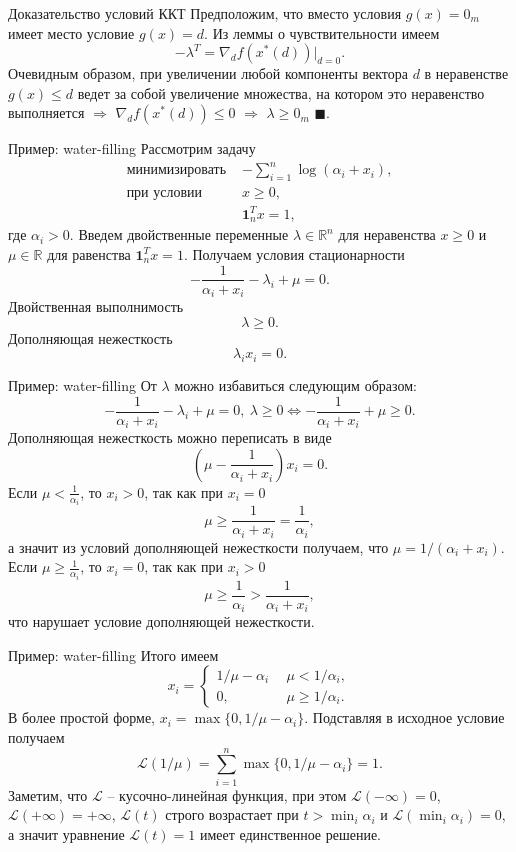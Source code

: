 \documentclass[10pt]{beamer}
\begin{document}
\begin{frame}{Доказательство условий ККТ}
Предположим, что вместо условия $g(x)=0_m$ имеет место условие $g(x)=d$. Из леммы о чувствительности имеем
$$
-\lambda^T=\nabla_d f(x^*(d))|_{d=0}.
$$
Очевидным образом, при увеличении любой компоненты вектора $d$ в неравенстве $g(x)\leq d$ ведет за собой увеличение множества, на котором это неравенство выполняется 
$\Rightarrow$ $\nabla_d f(x^*(d))\leq 0$ $\Rightarrow$ $\lambda\geq 0_m$ $\blacksquare$.

\end{frame}

\begin{frame}{Пример: water-filling}
Рассмотрим задачу
$$
\begin{array}{ll}
\mbox{минимизировать } & -\sum_{i=1}^n\log(\alpha_i+x_i),\\
\mbox{при условии }   & x\geq 0, \\
 & \mathbf{1}_n^Tx=1,
\end{array}
$$
где $\alpha_i>0$. Введем двойственные переменные $\lambda\in \mathbb{R}^n$ для неравенства $x\geq 0$ и $\mu\in \mathbb{R}$ для равенства $\mathbf{1}_n^Tx=1$. Получаем условия стационарности
$$
-\frac{1}{\alpha_i+x_i}-\lambda_i+\mu=0.
$$
Двойственная выполнимость 
$$
\lambda\geq 0.
$$
Дополняющая нежесткость
$$
\lambda_ix_i=0.
$$
\end{frame}
\begin{frame}{Пример: water-filling}
От $\lambda$ можно избавиться следующим образом:
$$
-\frac{1}{\alpha_i+x_i}-\lambda_i+\mu=0,~\lambda\geq 0 \Leftrightarrow
-\frac{1}{\alpha_i+x_i}+\mu\geq 0.
$$
Дополняющая нежесткость можно переписать в виде
$$
\left(\mu-\frac{1}{\alpha_i+x_i}\right)x_i=0.
$$
Если $\mu<\frac{1}{\alpha_i}$, то $x_i>0$, так как при $x_i=0$
$$
\mu\geq \frac{1}{\alpha_i+x_i}=\frac{1}{\alpha_i},
$$
а значит из условий дополняющей нежесткости получаем, что $\mu=1/(\alpha_i+x_i)$. \\
Если $\mu\geq \frac{1}{\alpha_i}$, то $x_i=0$, так как при $x_i>0$
$$
\mu\geq \frac{1}{\alpha_i}>\frac{1}{\alpha_i+x_i},
$$
что нарушает условие дополняющей нежесткости. 

\end{frame}

\begin{frame}{Пример: water-filling}
Итого имеем
$$
x_i=\left\{\begin{array}{ll}
1/\mu-\alpha_i ~&~\mu<1/\alpha_i,\\
0, ~&~\mu\geq 1/\alpha_i.
\end{array}\right.
$$
В более простой форме, $x_i=\max\{0, 1/\mu-\alpha_i\}$. Подставляя в исходное условие получаем
$$
\mathcal{L}(1/\mu)=\sum_{i=1}^n\max\{0, 1/\mu-\alpha_i\}=1.
$$
Заметим, что $\mathcal{L}$ -- кусочно-линейная функция, при этом $\mathcal{L}(-\infty)=0$, $\mathcal{L}(+\infty)=+\infty$, $\mathcal{L}(t)$ строго возрастает при $t>\min_i\alpha_i$ и $\mathcal{L}(\min_i\alpha_i)=0$, а значит уравнение $\mathcal{L}(t)=1$ имеет единственное решение.
\end{frame}
\end{document}
